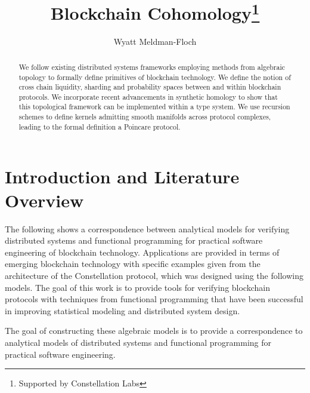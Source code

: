 \documentclass[runningheads]{llncs}
\begin{document}
%
\title{Blockchain Cohomology\thanks{Supported by Constellation Labs}}
%
%
\author{Wyatt Meldman-Floch }
%
%
%
\maketitle              %
%
\begin{abstract}
We follow existing distributed systems frameworks employing methods from algebraic topology to formally define primitives of blockchain technology. We define the notion of cross chain liquidity, sharding and probability spaces between and within blockchain protocols. We incorporate recent advancements in synthetic homology to show that this topological framework can be implemented within a type system. We use recursion schemes to define kernels admitting smooth manifolds across protocol complexes, leading to the formal definition a Poincare protocol.

\end{abstract}
%
%
%
\section{Introduction and Literature Overview}
The following shows a correspondence between analytical models for verifying distributed systems and functional programming for practical software engineering of blockchain technology. Applications are provided in terms of emerging blockchain technology with specific examples given from the architecture of the Constellation protocol, which was designed using the following models. The goal of this work is to provide tools for verifying blockchain protocols with techniques from functional programming that have been successful in improving statistical modeling and distributed system design.

The goal of constructing these algebraic models is to provide a correspondence to analytical models of distributed systems and functional programming for practical software engineering. 
\end{document}
